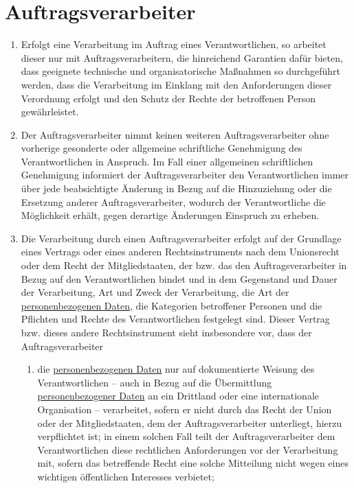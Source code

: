 \chapter{Auftragsverarbeiter}
\label{ch:28}


\begin{enumerate}

  \item Erfolgt eine Verarbeitung im Auftrag eines Verantwortlichen, so arbeitet dieser nur mit Auftragsverarbeitern,
   die hinreichend Garantien dafür bieten, dass geeignete technische und organisatorische Maßnahmen so durchgeführt
   werden, dass die Verarbeitung im Einklang mit den Anforderungen dieser Verordnung erfolgt und den Schutz der Rechte
   der betroffenen Person gewährleistet.
  \label{itm:28-1}

  \item Der Auftragsverarbeiter nimmt keinen weiteren Auftragsverarbeiter ohne vorherige gesonderte oder allgemeine
   schriftliche Genehmigung des Verantwortlichen in Anspruch. Im Fall einer allgemeinen schriftlichen Genehmigung
   informiert der Auftragsverarbeiter den Verantwortlichen immer über jede beabsichtigte Änderung in Bezug auf die
   Hinzuziehung oder die Ersetzung anderer Auftragsverarbeiter, wodurch der Verantwortliche die Möglichkeit erhält,
   gegen derartige Änderungen Einspruch zu erheben.
  \label{itm:28-2}

  \item Die Verarbeitung durch einen Auftragsverarbeiter erfolgt auf der Grundlage eines Vertrags oder eines anderen
   Rechtsinstruments nach dem Unionsrecht oder dem Recht der Mitgliedstaaten, der bzw. das den Auftragsverarbeiter in
   Bezug auf den Verantwortlichen bindet und in dem Gegenstand und Dauer der Verarbeitung, Art und Zweck der
   Verarbeitung, die Art der \hyperref[itm:04-1]{personenbezogenen Daten}, die Kategorien betroffener Personen und die Pflichten und Rechte
   des Verantwortlichen festgelegt sind. Dieser Vertrag bzw. dieses andere Rechtsinstrument sieht insbesondere vor,
   dass der Auftragsverarbeiter
  \label{itm:28-3-1}

  \begin{enumerate}
  
    \item die \hyperref[itm:04-1]{personenbezogenen Daten} nur auf dokumentierte Weisung des Verantwortlichen -- auch in Bezug auf die
     Übermittlung \hyperref[itm:04-1]{personenbezogener Daten} an ein Drittland oder eine internationale Organisation -- verarbeitet, sofern
     er nicht durch das Recht der Union oder der Mitgliedstaaten, dem der Auftragsverarbeiter unterliegt, hierzu
     verpflichtet ist; in einem solchen Fall teilt der Auftragsverarbeiter dem Verantwortlichen diese rechtlichen
     Anforderungen vor der Verarbeitung mit, sofern das betreffende Recht eine solche Mitteilung nicht wegen eines
     wichtigen öffentlichen Interesses verbietet;
    \label{itm:28-3-1a}


\end{enumerate}
\end{enumerate}
